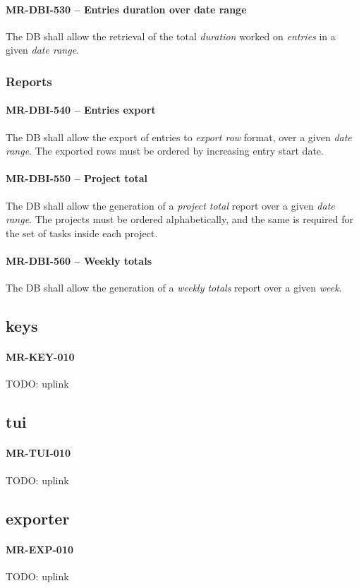 \paragraph{MR-DBI-530 -- Entries duration over date range}
The \gls{DB} shall allow the retrieval of the total \emph{duration} worked
on \emph{entries} in a given \emph{date range}.

\subsubsection{Reports}
\paragraph{MR-DBI-540 -- Entries export}
The \gls{DB} shall allow the export of entries to \emph{export row} format,
over a given \emph{date range}. The exported rows must be ordered by
increasing entry start date.

\paragraph{MR-DBI-550 -- Project total}
The \gls{DB} shall allow the generation of a \emph{project total} report
over a given \emph{date range}. The projects must be ordered alphabetically,
and the same is required for the set of tasks inside each project.

\paragraph{MR-DBI-560 -- Weekly totals}
The \gls{DB} shall allow the generation of a \emph{weekly totals} report
over a given \emph{week}.

\subsection{keys}
\paragraph{MR-KEY-010}
TODO: uplink

\subsection{tui}
\paragraph{MR-TUI-010}
TODO: uplink

\subsection{exporter}
\paragraph{MR-EXP-010}
TODO: uplink
